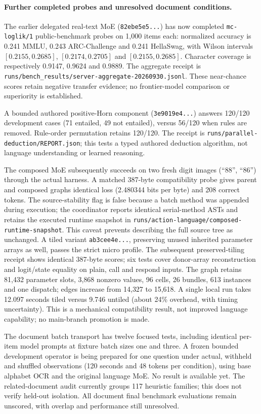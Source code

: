 \documentclass[11pt]{article}
\begin{document}
\paragraph{Further completed probes and unresolved document conditions.}
The earlier delegated real-text MoE (\texttt{82ebe5e5...}) has now completed
\texttt{mc-loglik/1} public-benchmark probes on 1{,}000 items each: normalized
accuracy is 0.241 MMLU, 0.243 ARC-Challenge and 0.241 HellaSwag, with Wilson
intervals $[0.2155,0.2685]$, $[0.2174,0.2705]$ and $[0.2155,0.2685]$.
Character coverage is respectively 0.9147, 0.9624 and 0.9889. The aggregate
receipt is \texttt{runs/bench\_results/server-aggregate-20260930.jsonl}.
These near-chance scores retain negative transfer evidence; no frontier-model
comparison or superiority is established.

A bounded authored positive-Horn component (\texttt{3e9019e4...}) answers
120/120 development cases (71 entailed, 49 not entailed), versus 56/120 when
rules are removed. Rule-order permutation retains 120/120. The receipt is
\texttt{runs/parallel-deduction/REPORT.json}; this tests a typed authored
deduction algorithm, not language understanding or learned reasoning.

The composed MoE subsequently succeeds on two fresh digit images (``88'',
``86'') through the actual harness. A matched 387-byte compatibility probe
gives parent and composed graphs identical loss (2.480344 bits per byte) and
208 correct tokens. The source-stability flag is false because a batch method
was appended during execution; the coordinator reports identical serial-method
ASTs and retains the executed runtime snapshot in
\texttt{runs/action-language/composed-runtime-snapshot}. This caveat prevents
describing the full source tree as unchanged. A tiled variant
\texttt{ab3cee4e...}, preserving unused inherited parameter arrays as well,
passes the strict micro profile. The subsequent preserved-tiling receipt shows
identical 387-byte scores; six tests cover donor-array reconstruction and
logit/state equality on plain, call and respond inputs. The graph retains
81{,}432 parameter slots, 3{,}868 nonzero values, 96 cells, 26 bundles,
613 instances and one dispatch; edges increase from 14{,}327 to 15{,}618.
A single local run takes 12.097 seconds tiled versus 9.746 untiled (about
24\% overhead, with timing uncertainty). This is a mechanical compatibility
result, not improved language capability; no main-branch promotion is made.

The document batch transport has twelve focused tests, including identical
per-item model prompts at fixture batch sizes one and three. A frozen bounded
development operator is being prepared for one question under actual, withheld
and shuffled observations (120 seconds and 48 tokens per condition), using
base alphabet OCR and the original language MoE. No result is available yet.
The related-document audit currently groups 117 heuristic families; this does
not verify held-out isolation. All document final benchmark evaluations remain
unscored, with overlap and performance still unresolved.
\end{document}
